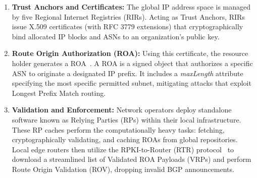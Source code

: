 \documentclass[conference]{IEEEtran}
\newcommand{\yiwen}[1]{{\color{ForestGreen}#1}}
\begin{document}
\yiwen{\begin{enumerate}
    \item \textbf{Trust Anchors and Certificates:} The global IP address space is managed by five Regional Internet Registries (RIRs). Acting as Trust Anchors, RIRs issue X.509 certificates (with RFC 3779 extensions) that cryptographically bind allocated IP blocks and ASNs to an organization's public key.
    
    \item \textbf{Route Origin Authorization (ROA):} Using this certificate, the resource holder generates a ROA~\cite{rfc6482}. A ROA is a signed object that authorizes a specific ASN to originate a designated IP prefix. It includes a \textit{maxLength} attribute specifying the most specific permitted subnet, mitigating attacks that exploit Longest Prefix Match routing.
    
    \item \textbf{Validation and Enforcement:} Network operators deploy standalone software known as Relying Parties (RPs) within their local infrastructure. These RP caches perform the computationally heavy tasks: fetching, cryptographically validating, and caching ROAs from global repositories. Local edge routers then utilize the RPKI-to-Router (RTR) protocol~\cite{rfc6810} to download a streamlined list of Validated ROA Payloads (VRPs) and perform Route Origin Validation (ROV), dropping invalid BGP announcements.
\end{enumerate}}
\end{document}
